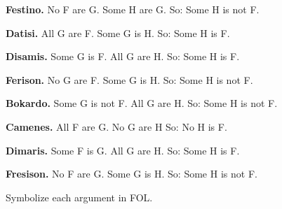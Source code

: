 \begin{ebullet}
	\item \textbf{Festino.} No F are G. Some H are G. So: Some H is not F.
	\item[] 
	\item \textbf{Datisi.} All G are F. Some G is H. So: Some H is F.
	\item[] 
	\item \textbf{Disamis.} Some G is F. All G are H. So: Some H is F.
	\item[] 
	\item \textbf{Ferison.} No G are F. Some G is H. So: Some H is not F.
	\item[] 
	\item \textbf{Bokardo.} Some G is not F. All G are H. So:  Some H is not F.
	\item[] 
	\item \textbf{Camenes.} All F are G. No G are H So: No H is F.
	\item[] 
	\item \textbf{Dimaris.} Some F is G. All G are H. So: Some H is F.
	\item[] 
	\item \textbf{Fresison.} No F are G. Some G is H. So: Some H is not F.
	\item[] 
\end{ebullet}
Symbolize each argument in FOL.

